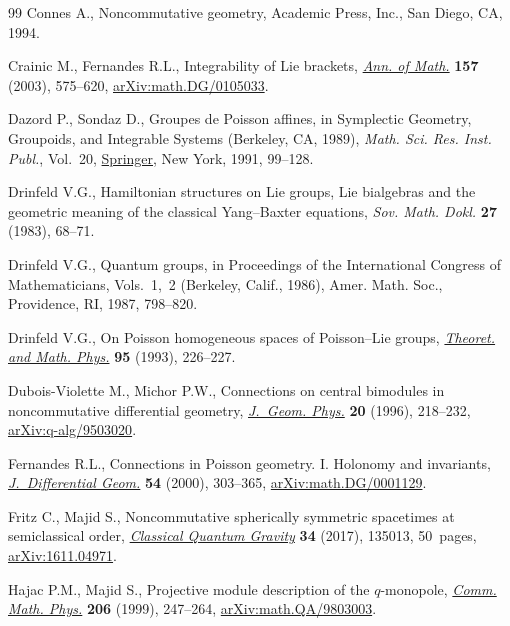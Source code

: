 \begin{thebibliography}{99}
Connes A., Noncommutative geometry, Academic Press, Inc., San Diego, CA, 1994.

Crainic M., Fernandes R.L., Integrability of {L}ie brackets, \href{https://doi.org/10.4007/annals.2003.157.575}{\textit{Ann. of
 Math.}} \textbf{157} (2003), 575--620, \href{https://arxiv.org/abs/math.DG/0105033}{arXiv:math.DG/0105033}.

Dazord P., Sondaz D., Groupes de {P}oisson affines, in Symplectic Geometry,
 Groupoids, and Integrable Systems ({B}erkeley, {CA}, 1989), \textit{Math.
 Sci. Res. Inst. Publ.}, Vol.~20, \href{https://doi.org/10.1007/978-1-4613-9719-9_6}{Springer}, New York, 1991, 99--128.

Drinfeld V.G., Hamiltonian structures on {L}ie groups, {L}ie bialgebras and the
 geometric meaning of the classical {Y}ang--{B}axter equations, \textit{Sov.
 Math. Dokl.} \textbf{27} (1983), 68--71.

Drinfeld V.G., Quantum groups, in Proceedings of the {I}nternational {C}ongress
 of {M}athematicians, {V}ols.~1,~2 ({B}erkeley, {C}alif., 1986), Amer. Math.
 Soc., Providence, RI, 1987, 798--820.

Drinfeld V.G., On {P}oisson homogeneous spaces of {P}oisson--{L}ie groups,
 \href{https://doi.org/10.1007/BF01017137}{\textit{Theoret. and Math. Phys.}} \textbf{95} (1993), 226--227.

Dubois-Violette M., Michor P.W., Connections on central bimodules in
 noncommutative differential geo\-met\-ry, \href{https://doi.org/10.1016/0393-0440(95)00057-7}{\textit{J.~Geom. Phys.}} \textbf{20}
 (1996), 218--232, \href{https://arxiv.org/abs/q-alg/9503020}{arXiv:q-alg/9503020}.

Fernandes R.L., Connections in {P}oisson geometry. {I}. {H}olonomy and
 invariants, \href{https://doi.org/10.4310/jdg/1214341648}{\textit{J.~Differential Geom.}} \textbf{54} (2000), 303--365,
 \href{https://arxiv.org/abs/math.DG/0001129}{arXiv:math.DG/0001129}.

Fritz C., Majid S., Noncommutative spherically symmetric spacetimes at
 semiclassical order, \href{https://doi.org/10.1088/1361-6382/aa72a5}{\textit{Classical Quantum Gravity}} \textbf{34} (2017),
 135013, 50~pages, \href{https://arxiv.org/abs/1611.04971}{arXiv:1611.04971}.

Hajac P.M., Majid S., Projective module description of the {$q$}-monopole,
 \href{https://doi.org/10.1007/s002200050704}{\textit{Comm. Math. Phys.}} \textbf{206} (1999), 247--264,
 \href{https://arxiv.org/abs/math.QA/9803003}{arXiv:math.QA/9803003}.


\end{thebibliography}
